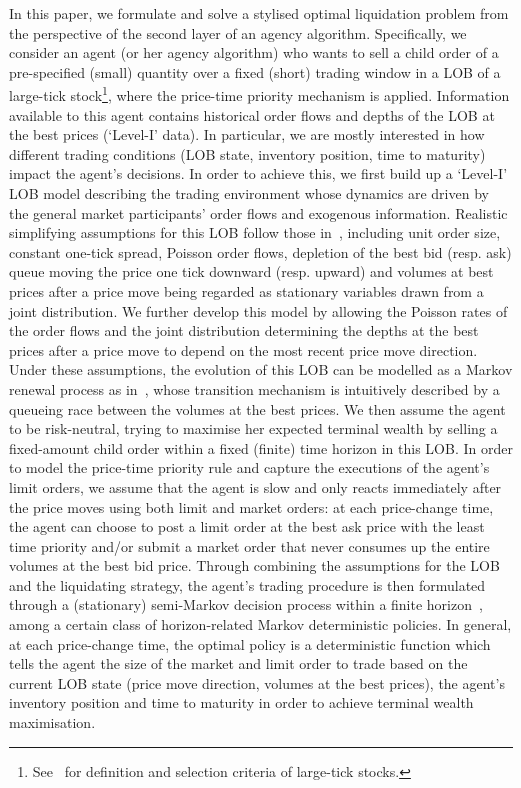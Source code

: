 \documentclass{amsart}[11pt]
\numberwithin{equation}{section}
\theoremstyle{definition}
\begin{document}
In this paper, we formulate and solve a stylised optimal liquidation problem from the perspective of the second layer of an agency algorithm.
Specifically, we consider an agent (or her agency algorithm) who wants to sell a child order of a pre-specified (small) quantity over a fixed (short) trading window in a LOB of a large-tick stock\footnote{See~\cite[Section 4]{gould2015queue} for definition and selection criteria of large-tick stocks.},
where the price-time priority mechanism is applied.
Information available to this agent contains historical order flows and depths of the LOB at the best prices (`Level-I' data).
In particular, we are mostly interested in how different trading conditions 
(LOB state, inventory position, time to maturity) impact the agent's decisions.
In order to achieve this,
we first build up a `Level-I' LOB model describing the trading environment 
whose dynamics are driven by the general market participants' order flows and exogenous information. 
Realistic simplifying assumptions for this LOB follow those in~\cite{cont2013price, cont2010stochastic},
including unit order size, 
constant one-tick spread, 
Poisson order flows,
depletion of the best bid (resp. ask) queue moving the price one tick downward (resp. upward)
and volumes at best prices after a price move being regarded as stationary variables drawn from a joint distribution. 
We further develop this model by allowing the Poisson rates of the order flows 
and the joint distribution determining the depths at the best prices after a price move
to depend on the most recent price move direction.
Under these assumptions, the evolution of this LOB can be modelled as a Markov renewal process as in~\cite{fodra2015semi},
whose transition mechanism is intuitively described by a queueing race between the volumes at the best prices.
We then assume the agent to be risk-neutral,
trying to maximise her expected terminal wealth by selling a fixed-amount child order within a fixed (finite) time horizon in this LOB.
In order to model the price-time priority rule and capture the executions of the agent's limit orders, we assume that the agent is slow and only reacts immediately after the price moves using both limit and market orders:
at each price-change time,
the agent can choose to post a limit order at the best ask price with the least time priority 
and/or submit a market order that never consumes up the entire volumes at the best bid price.
Through combining the assumptions for the LOB and the liquidating strategy,
the agent's trading procedure is then formulated through a (stationary) semi-Markov decision process within a finite horizon~\cite{huang2011finite},
among a certain class of horizon-related Markov deterministic policies.
In general, at each price-change time, the optimal policy is a deterministic function
which tells the agent the size of the market and limit order to trade based on the current LOB state
(price move direction, volumes at the best prices), the agent's inventory position and time to maturity in order to achieve terminal wealth maximisation.
\end{document}
